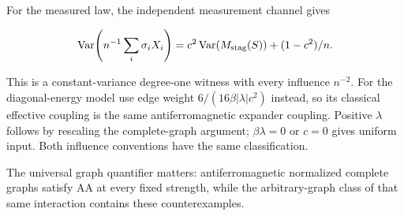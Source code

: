 For the measured law, the independent measurement channel gives

\[
\operatorname{Var}\!\left(n^{-1}\sum_i\sigma_iX_i\right)
=c^2\operatorname{Var}(M_{\rm stag}(S))+(1-c^2)/n.
\]

This is a constant-variance degree-one witness with every influence
\(n^{-2}\). For the diagonal-energy model use edge weight
\(6/(16\beta|\lambda|c^2)\) instead, so its classical effective coupling
is the same antiferromagnetic expander coupling. Positive \(\lambda\)
follows by rescaling the complete-graph argument; \(\beta\lambda=0\) or
\(c=0\) gives uniform input. Both influence conventions have the same
classification.

The universal graph quantifier matters: antiferromagnetic normalized
complete graphs satisfy AA at every fixed strength, while the
arbitrary-graph class of that same interaction contains these
counterexamples.
